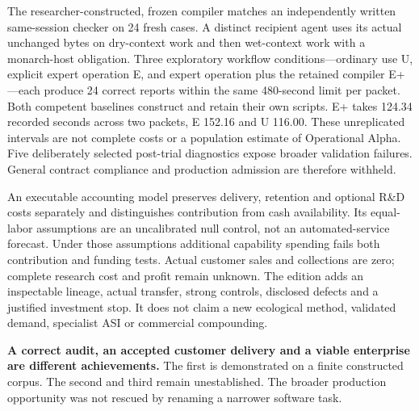 \documentclass[11pt]{article}
\begin{document}
The researcher-constructed, frozen compiler matches an independently written same-session checker on 24 fresh cases. A distinct recipient agent uses its actual unchanged bytes on dry-context work and then wet-context work with a monarch-host obligation. Three exploratory workflow conditions---ordinary use U, explicit expert operation E, and expert operation plus the retained compiler E+---each produce 24 correct reports within the same 480-second limit per packet. Both competent baselines construct and retain their own scripts. E+ takes 124.34 recorded seconds across two packets, E 152.16 and U 116.00. These unreplicated intervals are not complete costs or a population estimate of Operational Alpha. Five deliberately selected post-trial diagnostics expose broader validation failures. General contract compliance and production admission are therefore withheld.

An executable accounting model preserves delivery, retention and optional R\&D costs separately and distinguishes contribution from cash availability. Its equal-labor assumptions are an uncalibrated null control, not an automated-service forecast. Under those assumptions additional capability spending fails both contribution and funding tests. Actual customer sales and collections are zero; complete research cost and profit remain unknown. The edition adds an inspectable lineage, actual transfer, strong controls, disclosed defects and a justified investment stop. It does not claim a new ecological method, validated demand, specialist ASI or commercial compounding.

\begin{boundary}[title=The finding readers should carry forward]
\textbf{A correct audit, an accepted customer delivery and a viable enterprise are different achievements.} The first is demonstrated on a finite constructed corpus. The second and third remain unestablished. The broader production opportunity was not rescued by renaming a narrower software task.
\end{boundary}
\end{document}
